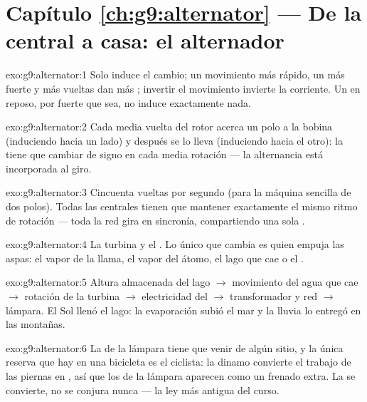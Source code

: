 \section*{Capítulo \ref{ch:g9:alternator} --- De la central a casa: el alternador}

\begin{solution}{exo:g9:alternator:1}
Solo induce el cambio; un movimiento más rápido, un  más
fuerte y más vueltas dan más ; invertir el movimiento
invierte la corriente. Un  en reposo, por fuerte que sea, no
induce exactamente nada.
\end{solution}

\begin{solution}{exo:g9:alternator:2}
Cada media vuelta del rotor acerca un polo a la bobina (induciendo
hacia un lado) y después se lo lleva (induciendo hacia el otro): la
 tiene que cambiar de signo en cada media rotación --- la
alternancia está incorporada al giro.
\end{solution}

\begin{solution}{exo:g9:alternator:3}
Cincuenta vueltas por segundo (para la máquina sencilla de dos polos).
Todas las centrales tienen que mantener exactamente el mismo ritmo de
rotación --- toda la red gira en sincronía, compartiendo una sola
.
\end{solution}

\begin{solution}{exo:g9:alternator:4}
La turbina y el . Lo único que cambia es quien empuja las
aspas: el vapor de la llama, el vapor del átomo, el lago que cae o el
.
\end{solution}

\begin{solution}{exo:g9:alternator:5}
Altura almacenada del lago $\to$ movimiento del agua que cae $\to$
rotación de la turbina $\to$ electricidad del  $\to$
transformador y red $\to$ lámpara. El Sol llenó el lago: la evaporación
subió el mar y la lluvia lo entregó en las montañas.
\end{solution}

\begin{solution}{exo:g9:alternator:6}
La  de la lámpara tiene que venir de algún sitio, y la única
reserva que hay en una bicicleta es el ciclista: la dinamo convierte el
trabajo de las piernas en , así que los  de la
lámpara aparecen como un frenado extra. La  se convierte, no
se conjura nunca --- la ley más antigua del curso.
\end{solution}

